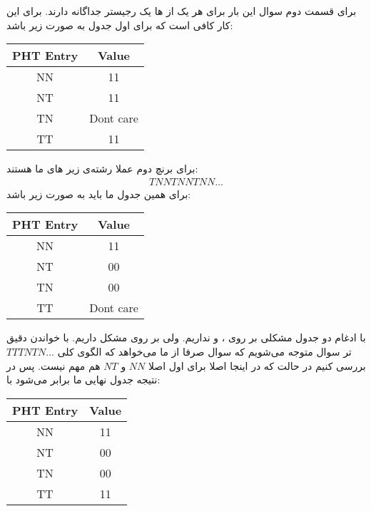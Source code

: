 برای قسمت دوم سوال این بار برای هر یک از
ها
یک رجیستر جداگانه دارند. برای این کار کافی است که برای
اول جدول به صورت زیر باشد:
\begin{latin}
    \centering
    \begin{tabular}{|c|c|}
        \hline
        PHT Entry & Value\\
        \hline
        NN & 11\\
        \hline
        NT & 11\\
        \hline
        TN & Dont care\\
        \hline
        TT & 11\\
        \hline
    \end{tabular}
\end{latin}
برای برنچ دوم عملا رشته‌ی زیر
های
ما هستند:
\begin{gather*}
    TNNTNNTNN\dots
\end{gather*}
برای همین جدول ما باید به صورت زیر باشد:
\begin{latin}
    \centering
    \begin{tabular}{|c|c|}
        \hline
        PHT Entry & Value\\
        \hline
        NN & 11\\
        \hline
        NT & 00\\
        \hline
        TN & 00\\
        \hline
        TT & Dont care\\
        \hline
    \end{tabular}
\end{latin}
با ادغام دو جدول مشکلی بر روی
،  و 
نداریم. ولی بر روی
مشکل داریم. با خواندن دقیق تر سوال متوجه می‌شویم که سوال صرفا از ما می‌خواهد که الگوی کلی
$TTTNTN\dots$
 بررسی کنیم در حالت  که در اینجا اصلا برای
اول اصلا
$NN$ و $NT$
هم مهم نیست. پس در نتیجه جدول نهایی ما برابر می‌شود با:
\begin{latin}
    \centering
    \begin{tabular}{|c|c|}
        \hline
        PHT Entry & Value\\
        \hline
        NN & 11\\
        \hline
        NT & 00\\
        \hline
        TN & 00\\
        \hline
        TT & 11\\
        \hline
    \end{tabular}
\end{latin}
